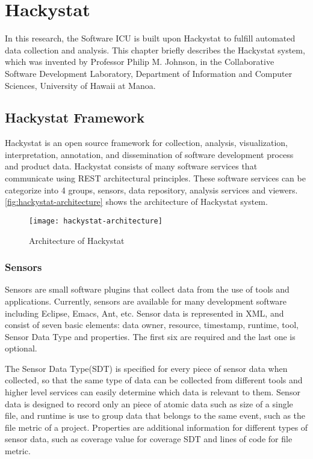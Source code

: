 \chapter{Hackystat}
In this research, the Software ICU is built upon Hackystat to fulfill automated data collection and analysis. This chapter briefly describes the Hackystat system, which was invented by Professor Philip M. Johnson, in the Collaborative Software Development Laboratory, Department of Information and Computer Sciences, University of Hawaii at Manoa. 
 
\section{Hackystat Framework}
Hackystat is an open source framework for collection, analysis, visualization, interpretation, annotation, and dissemination of software development process and product data. Hackystat consists of many software services that communicate using REST architectural principles\cite{rest}. These software services can be categorize into 4 groups, sensors, data repository, analysis services and viewers. \autoref{fig:hackystat-architecture} shows the architecture of Hackystat system. 

\begin{figure}[htbp]
   \centering
   \texttt{[image: hackystat-architecture]} 
   \caption{Architecture of Hackystat}
   \label{fig:hackystat-architecture}
\end{figure}

\subsection{Sensors}
Sensors are small software plugins that collect data from the use of tools and applications. Currently, sensors are available for many development software including Eclipse, Emacs, Ant, etc. Sensor data is represented in XML, and consist of seven basic elements: data owner, resource, timestamp, runtime, tool, Sensor Data Type and properties. The first six are required and the last one is optional. 

The Sensor Data Type(SDT) is specified for every piece of sensor data when collected, so that the same type of data can be collected from different tools and higher level services can easily determine which data is relevant to them. Sensor data is designed to record only an piece of atomic data such as size of a single file, and runtime is use to group data that belongs to the same event, such as the file metric of a project. Properties are additional information for different types of sensor data, such as coverage value for coverage SDT and lines of code for file metric. 

